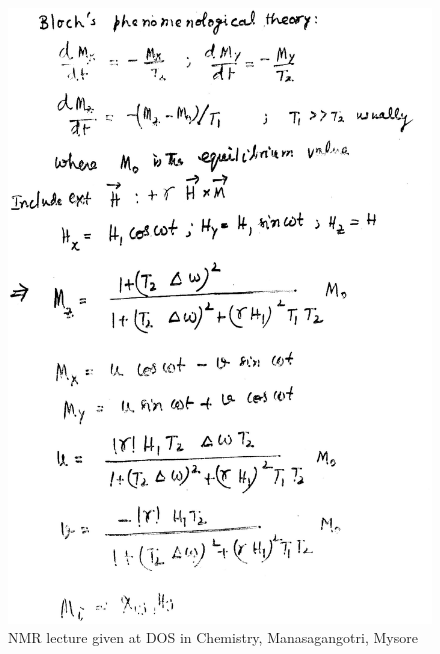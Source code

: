 \begin{figure}[H]
\centering
\includegraphics[scale=0.48]{src/images/chap8/2.eps}
\caption{NMR lecture given at DOS in Chemistry, Manasagangotri, Mysore}
\end{figure}
